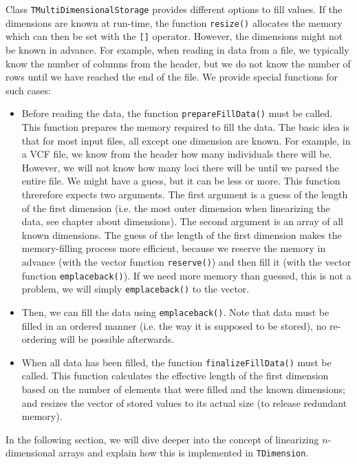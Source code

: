 \documentclass[a4paper,11pt]{article}
\newcommand{\class}[1]{\texttt{#1}}
\newcommand{\pubfunc}[1]{\texttt{#1()}}
\begin{document}
Class \class{TMultiDimensionalStorage} provides different options to fill values. If the dimensions are known at run-time, the function \pubfunc{resize} allocates the memory which can then be set with the \texttt{[]} operator.
However, the dimensions might not be known in advance. For example, when reading in data from a file, we typically know the number of columns from the header, but we do not know the number of rows until we have reached the end of the file. We provide special functions for such cases:
\begin{itemize}
 \item Before reading the data, the function \pubfunc{prepareFillData} must be called. This function prepares the memory required to fill the data. The basic idea is that for most input files, all except one dimension are known. For example, in a VCF file, we know from the header how many individuals there will be. However, we will not know how many loci there will be until we parsed the entire file. We might have a guess, but it can be less or more. This function threrefore expects two arguments. The first argument is a guess of the length of the first dimension (i.e. the most outer dimension when linearizing the data, see chapter about dimensions). The second argument is an array of all known dimensions. The guess of the length of the first dimension makes the memory-filling process more efficient, because we reserve the memory in advance (with the vector function \pubfunc{reserve}) and then fill it (with the vector function \pubfunc{emplace{\textunderscore}back}). If we need more memory than guessed, this is not a problem, we will simply \pubfunc{emplace{\textunderscore}back} to the vector.
 \item Then, we can fill the data using \pubfunc{emplace{\textunderscore}back}. Note that data must be filled in an ordered manner (i.e. the way it is supposed to be stored), no re-ordering will be possible afterwards.
 \item When all data has been filled, the function \pubfunc{finalizeFillData} must be called. This function calculates the effective length of the first dimension based on the number of elements that were filled and the known dimensions; and resizes the vector of stored values to its actual size (to release redundant memory).
\end{itemize}


In the following section, we will dive deeper into the concept of linearizing $n$-dimensional arrays and explain how this is implemented in \class{TDimension}.
\end{document}
